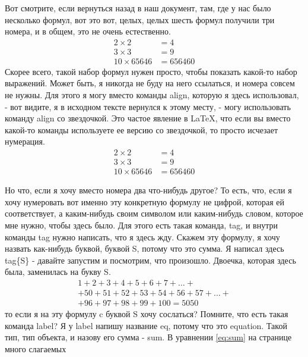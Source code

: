 \documentclass[a4paper,12pt]{article} %
\begin{document}
{ Вот
 смотрите, если вернуться назад в наш документ, там, где у нас было несколько формул, вот это вот,
 целых, целых шесть формул получили три номера, и
 в общем, это не очень естественно. 
 \begin{align}
 2\times 2&=4\\
 3\times 3&=9\\
 10\times 65646 &= 656460
 \end{align}
 Скорее всего,
 такой набор формул нужен просто, чтобы показать
 какой-то набор выражений. Может быть, я никогда не буду на
 него ссылаться, и номера совсем не нужны. Для этого я могу вместо команды align,
 которую я здесь использовал, - вот видите, я в
 исходном тексте вернулся к этому месту, - могу
 использовать команду align со звездочкой. Это частое явление
 в LaTeX, что если вы вместо какой-то команды
 используете ее версию со звездочкой, то просто
 исчезает нумерация. 
  \begin{align*}
  2\times 2&=4\\
  3\times 3&=9\\
  10\times 65646 &= 656460
  \end{align*}
 
  Но что, если я хочу вместо номера
  два что-нибудь другое? То есть, что, если я хочу
  нумеровать вот именно эту конкретную формулу не цифрой, которая
  ей соответствует, а каким-нибудь своим символом или каким-нибудь словом,
  которое мне нужно, чтобы здесь было. Для этого есть такая команда, tag, и
  внутри команды tag нужно написать, что я здесь
  жду. Скажем эту формулу, я хочу назвать как-нибудь буквой, буквой S, потому что
  это сумма. Я написал здесь tag\{S\} - давайте запустим и
  посмотрим, что произошло. Двоечка, которая здесь была, заменилась на
  букву S.
 \begin{multline}
 1+2+3+4+5+6+7+\dots+ \\ +50+51+52+53+54+56+57+\dots +\\ +96+97+98+99+100=5050\tag{S}\label{eq:sum}
 \end{multline}
 то если я на эту формулу c буквой S
 хочу сослаться? Помните, что есть такая команда label? Я у label напишу название eq, потому что это
 equation. Такой тип, тип объекта, и назову его
 сумма - sum. 
 В уравнении \eqref{eq:sum} на странице \pageref{eq:sum} много слагаемых
 
}
\end{document}
